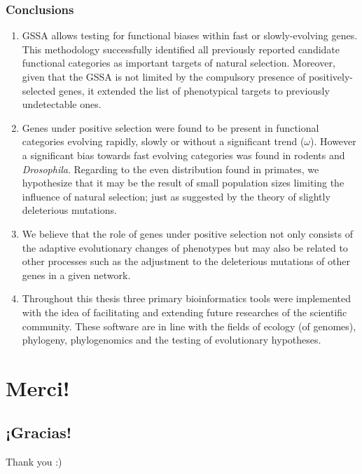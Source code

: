 \documentclass[hyperref={pagebackref=true},table]{beamer}
\begin{document}
\begin{frame}
  \frametitle{Conclusions}
  \begin{enumerate}
    \scriptsize
    \setlength{\itemsep}{10pt}
    \setlength{\parskip}{0pt}
    \setlength{\parsep}{0pt}
    \setcounter{enumi}{5}
\item GSSA allows testing for functional biases within fast or slowly-evolving genes. This methodology successfully identified all previously reported candidate functional categories as important targets of natural selection. Moreover, given that the GSSA is not limited by the compulsory presence of positively-selected genes, it extended the list of phenotypical targets to previously undetectable ones.
\item Genes under positive selection were found to be present in functional categories evolving rapidly, slowly or without a significant trend ($\omega$). However a significant bias towards fast evolving categories was found in rodents and \textit{Drosophila}. Regarding to the even distribution found in primates, we hypothesize that it may be the result of small population sizes limiting the influence of natural selection; just as suggested by the theory of slightly deleterious mutations.
\item  We believe that the role of genes under positive selection not only consists of the adaptive evolutionary changes of phenotypes but may also be related to other processes such as the adjustment to the deleterious mutations of other genes in a given network.
\item Throughout this thesis three primary bioinformatics tools were implemented with the idea of facilitating and extending future researches of the scientific community. These software are in line with the fields of ecology (of genomes), phylogeny, phylogenomics and the testing of evolutionary hypotheses.
\end{enumerate}
\end{frame}

\section*{Merci!}
\subsection*{¡Gracias!}
\begin{frame}
  \begin{center}
    Thank you :)
  \end{center}
\end{frame}
\end{document}
